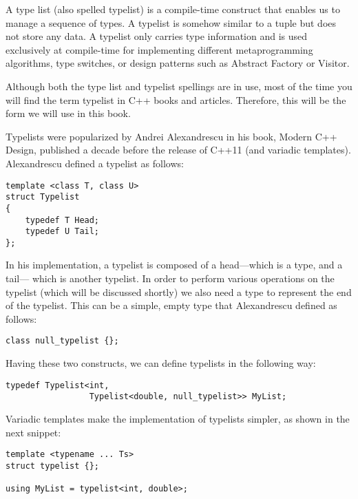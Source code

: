 
A type list (also spelled typelist) is a compile-time construct that enables us to manage a sequence of types. A typelist is somehow similar to a tuple but does not store any data. A typelist only carries type information and is used exclusively at compile-time for implementing different metaprogramming algorithms, type switches, or design patterns such as Abstract Factory or Visitor.

\begin{tcolorbox}[breakable,enhanced jigsaw,colback=blue!5!white,colframe=blue!75!black,title={Important Note}]
Although both the type list and typelist spellings are in use, most of the time you will find the term typelist in C++ books and articles. Therefore, this will be the form we will use in this book.
\end{tcolorbox}

Typelists were popularized by Andrei Alexandrescu in his book, Modern C++ Design, published a decade before the release of C++11 (and variadic templates). Alexandrescu defined a typelist as follows:

\begin{lstlisting}[style=styleCXX]
template <class T, class U>
struct Typelist
{
	typedef T Head;
	typedef U Tail;
};
\end{lstlisting}

In his implementation, a typelist is composed of a head—which is a type, and a tail— which is another typelist. In order to perform various operations on the typelist (which will be discussed shortly) we also need a type to represent the end of the typelist. This can be a simple, empty type that Alexandrescu defined as follows:

\begin{lstlisting}[style=styleCXX]
class null_typelist {};
\end{lstlisting}

Having these two constructs, we can define typelists in the following way:

\begin{lstlisting}[style=styleCXX]
typedef Typelist<int,
				 Typelist<double, null_typelist>> MyList;
\end{lstlisting}

Variadic templates make the implementation of typelists simpler, as shown in the next snippet:

\begin{lstlisting}[style=styleCXX]
template <typename ... Ts>
struct typelist {};

using MyList = typelist<int, double>;
\end{lstlisting}

